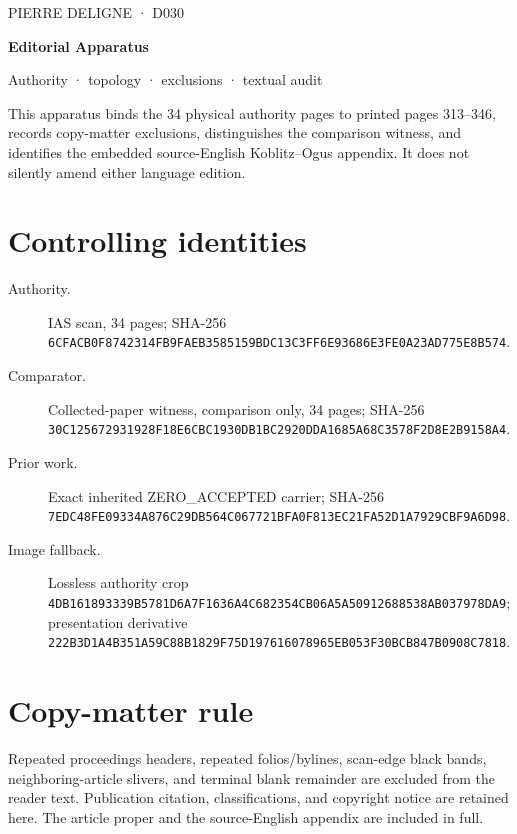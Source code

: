 \documentclass[10pt,twoside]{article}
\begin{document}
\thispagestyle{empty}
\begin{center}
\vspace*{0.15\textheight}
{\sffamily\small\color{D030Accent}PIERRE DELIGNE · D030}\par\vspace{1em}
{\Huge\bfseries Editorial Apparatus}\par\vspace{0.8em}
{\Large Authority · topology · exclusions · textual audit}\par\vfill
\begin{minipage}{0.82\textwidth}\small\color{D030Muted}
This apparatus binds the 34 physical authority pages to printed pages 313--346, records copy-matter exclusions, distinguishes the comparison witness, and identifies the embedded source-English Koblitz--Ogus appendix. It does not silently amend either language edition.
\end{minipage}
\vspace*{0.12\textheight}
\end{center}
\clearpage
\section*{Controlling identities}
\begin{description}
\item[Authority.] IAS scan, 34 pages; SHA-256 \nolinkurl{6CFACB0F8742314FB9FAEB3585159BDC13C3FF6E93686E3FE0A23AD775E8B574}.
\item[Comparator.] Collected-paper witness, comparison only, 34 pages; SHA-256 \nolinkurl{30C125672931928F18E6CBC1930DB1BC2920DDA1685A68C3578F2D8E2B9158A4}.
\item[Prior work.] Exact inherited ZERO\_ACCEPTED carrier; SHA-256 \nolinkurl{7EDC48FE09334A876C29DB564C067721BFA0F813EC21FA52D1A7929CBF9A6D98}.
\item[Image fallback.] Lossless authority crop \nolinkurl{4DB161893339B5781D6A7F1636A4C682354CB06A5A50912688538AB037978DA9}; presentation derivative \nolinkurl{222B3D1A4B351A59C88B1829F75D197616078965EB053F30BCB847B0908C7818}.
\end{description}
\section*{Copy-matter rule}
Repeated proceedings headers, repeated folios/bylines, scan-edge black bands, neighboring-article slivers, and terminal blank remainder are excluded from the reader text. Publication citation, classifications, and copyright notice are retained here. The article proper and the source-English appendix are included in full.
\end{document}
